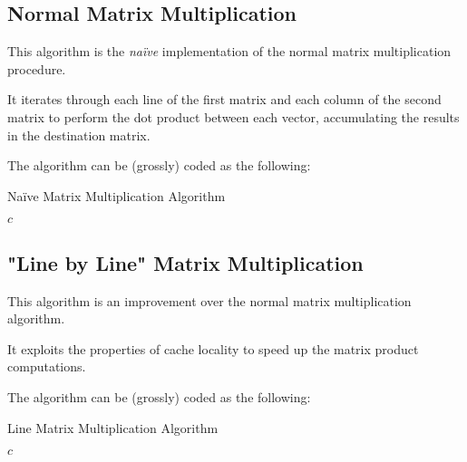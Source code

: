 \documentclass[11pt,a4paper]{article}
\begin{document}
\subsection{Normal Matrix Multiplication}

This algorithm is the \emph{naïve} implementation of the normal matrix multiplication procedure.

It iterates through each line of the first matrix and each column of the second matrix to perform the dot product between each vector, accumulating the results in the destination matrix.

The algorithm can be (grossly) coded as the following:

\begin{algorithm}[H]
    \caption{Naïve Matrix Multiplication Algorithm}
    \begin{algorithmic}[1]
                    \EndFor
                \EndFor
            \EndFor
            \State \Return $c$
        \EndFunction
    \end{algorithmic}
\end{algorithm}

\subsection{"Line by Line" Matrix Multiplication}

This algorithm is an improvement over the normal matrix multiplication algorithm.

It exploits the properties of cache locality to speed up the matrix product computations.

The algorithm can be (grossly) coded as the following:
\begin{algorithm}[H]
    \caption{Line Matrix Multiplication Algorithm}
    \begin{algorithmic}[1]
                    \EndFor
                \EndFor
            \EndFor
            \State \Return $c$
        \EndFunction
    \end{algorithmic}
\end{algorithm}
\end{document}

